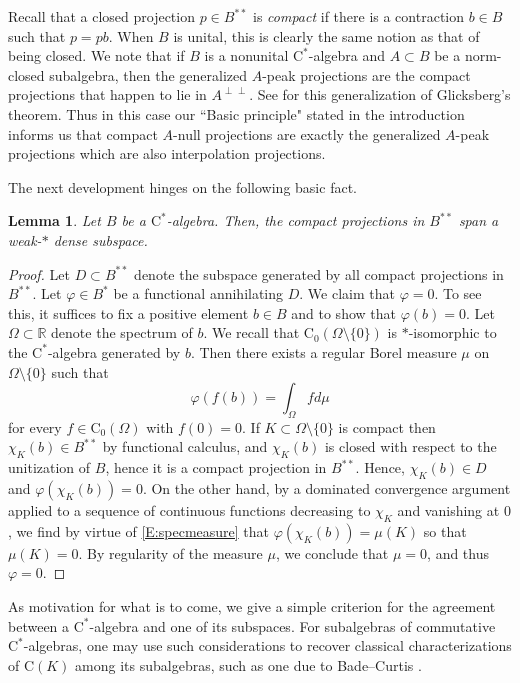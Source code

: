 \documentclass[10pt]{amsart}
\newcommand{\bR}{{\mathbb{R}}}
\newcommand{\rC}{\mathrm{C}}
\renewcommand{\phi}{\varphi}
\newtheorem{lemma}{Lemma}[section]
\theoremstyle{definition}
\begin{document}
 Recall that a closed projection $p\in B^{**}$ is \emph{compact} if there is a contraction $b\in B$ such that $p=pb$. When $B$ is unital, this is clearly the same notion as that of being closed. 
We note that if $B$ is a nonunital $\rC^*$-algebra and  $A \subset B$ be a norm-closed subalgebra, then the 
generalized $A$-peak projections are the compact projections that happen to lie in $A^{\perp \perp}$.  See \cite{BR2013,BN2012} for this generalization of Glicksberg's theorem.
Thus in this case our ``Basic principle" stated in the introduction informs us that compact $A$-null projections are exactly the 
generalized $A$-peak projections which are also interpolation projections. 

The next development hinges on the following basic  fact. 


\begin{lemma}\label{L:closeddense}
Let $B$ be a $\rC^*$-algebra. Then, the compact projections in $B^{**}$ span a weak-$*$ dense subspace.
\end{lemma}
\begin{proof}
Let $D\subset B^{**}$ denote the subspace generated by all compact projections in $B^{**}$. Let $\phi \in B^{*}$ be a functional annihilating $D$. We claim that $\phi=0$. To see this, it suffices to fix a positive element $b\in B$ and to show that $\phi(b)=0$. Let $\Omega\subset \bR$ denote the spectrum of $b$.
We recall that 
$\rC_0(\Omega\setminus\{0\})$ is $*$-isomorphic to the $\rC^*$-algebra generated by $b$. Then there exists a regular Borel measure $\mu$ on $\Omega \setminus \{ 0 \}$ such that
\begin{equation}\label{E:specmeasure}
\phi(f(b))=\int_\Omega f d\mu 
\end{equation}
for every $f\in \rC_0(\Omega)$ with $f(0)=0$.
If $K\subset \Omega \setminus \{ 0 \}$ is compact then $\chi_K(b) \in B^{**}$ by functional calculus, and $\chi_K(b)$ is closed with respect to the unitization of $B$, hence it
is a compact projection in $B^{**}$\cite[Lemma 2.4]{AAP1989}.  Hence, $\chi_K(b)\in D$ and $\phi(\chi_K(b))=0$.
On the other hand, by a dominated convergence  argument applied to a sequence of continuous functions decreasing to $\chi_K$ and vanishing at $0$, we find by virtue of \eqref{E:specmeasure} that $\phi(\chi_K(b))=\mu(K)$ so that $\mu(K)=0$. By regularity of the measure $\mu$, we conclude that $\mu=0$, and thus $\phi=0$.
\end{proof}




As motivation for what is to come, we give a simple criterion for the agreement between a $\rC^*$-algebra and one of its subspaces. For subalgebras of commutative $\rC^*$-algebras, one may use such 
considerations to  recover classical characterizations of $\rC(K)$ among its subalgebras, such as one due to Bade--Curtis \cite[Theorem B]{BC1966}. 
\end{document}
